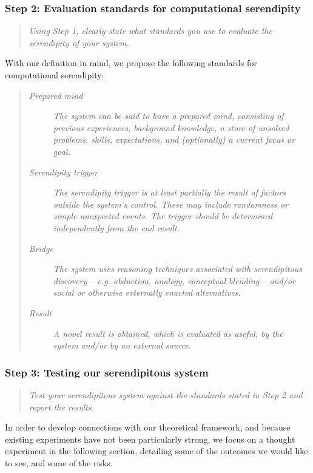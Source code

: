 \subsubsection*{ Step 2: Evaluation standards for computational serendipity}
\begin{quote} {\em Using Step 1, clearly state what standards you use to evaluate the serendipity of your
    system. }\end{quote}

With our definition in mind, we propose the following standards for
computational serendipity:

\begin{quote}
\begin{description}
\item[\emph{Prepared mind}] \emph{The system can be said to have a
  prepared mind, consisting of previous experiences, background
  knowledge, a store of unsolved problems, skills, expectations, and
  (optionally) a current focus or goal.}
\item[\emph{Serendipity trigger}] \emph{The serendipity trigger is at
  least partially the result of factors outside the system's control.
  These may include randomness or simple unexpected events.  The
  trigger should be determined independently from the end result.}
\item[\emph{Bridge}] \emph{The system uses reasoning techniques
  associated with serendipitous discovery -- e.g.  abduction, analogy,
  conceptual blending -- and/or social or otherwise externally enacted
  alternatives.}
\item[\emph{Result}] \emph{A novel result is obtained, which is
  evaluated as useful, by the system and/or by an external source.}
\end{description}
\end{quote}

\subsubsection*{Step 3: Testing our serendipitous system}

\begin{quote} {\em Test your serendipitous system against the standards stated in Step 2 and report the
results.}\end{quote}

In order to develop connections with our theoretical framework, and
because existing experiments have not been particularly strong, we
focus on a thought experiment in the following section, detailing some
of the outcomes we would like to see, and some of the risks.


